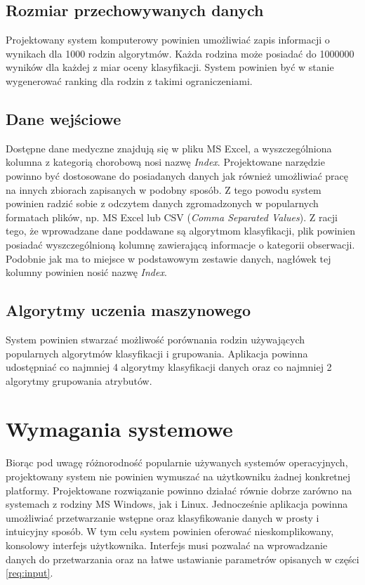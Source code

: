 \documentclass[../thesis.tex]{subfiles}
\begin{document}
\subsection{Rozmiar przechowywanych danych}

Projektowany system komputerowy powinien umożliwiać zapis informacji o wynikach dla 1000 rodzin algorytmów. Każda rodzina może posiadać do 1000000 wyników dla każdej z miar oceny klasyfikacji. System powinien być w stanie wygenerować ranking dla rodzin z takimi ograniczeniami.

\subsection{Dane wejściowe}

Dostępne dane medyczne znajdują się w pliku MS Excel, a wyszczególniona kolumna z kategorią chorobową nosi nazwę \emph{Index}. Projektowane narzędzie powinno być dostosowane do posiadanych danych jak również umożliwiać pracę na innych zbiorach zapisanych w podobny sposób. Z tego powodu system powinien radzić sobie z odczytem danych zgromadzonych w popularnych formatach plików, np. MS Excel lub CSV (\textit{Comma Separated Values}). Z racji tego, że wprowadzane dane poddawane są algorytmom klasyfikacji, plik powinien posiadać wyszczególnioną kolumnę zawierającą informacje o kategorii obserwacji. Podobnie jak ma to miejsce w podstawowym zestawie danych, nagłówek tej kolumny powinien nosić nazwę \textit{Index}.

\subsection{Algorytmy uczenia maszynowego}

System powinien stwarzać możliwość porównania rodzin używających popularnych algorytmów klasyfikacji i grupowania. Aplikacja powinna udostępniać co najmniej 4 algorytmy klasyfikacji danych oraz co najmniej 2 algorytmy grupowania atrybutów.

\section{Wymagania systemowe}

Biorąc pod uwagę różnorodność popularnie używanych systemów operacyjnych, projektowany system nie powinien wymuszać na użytkowniku żadnej konkretnej platformy. Projektowane rozwiązanie powinno działać równie dobrze zarówno na systemach z rodziny MS Windows, jak i Linux. Jednocześnie aplikacja powinna umożliwiać przetwarzanie wstępne oraz klasyfikowanie danych w prosty i intuicyjny sposób. W tym celu system powinien oferować nieskomplikowany, konsolowy interfejs użytkownika. Interfejs musi pozwalać na wprowadzanie danych do przetwarzania oraz na łatwe ustawianie parametrów opisanych w części \ref{req:input}.
\end{document}
